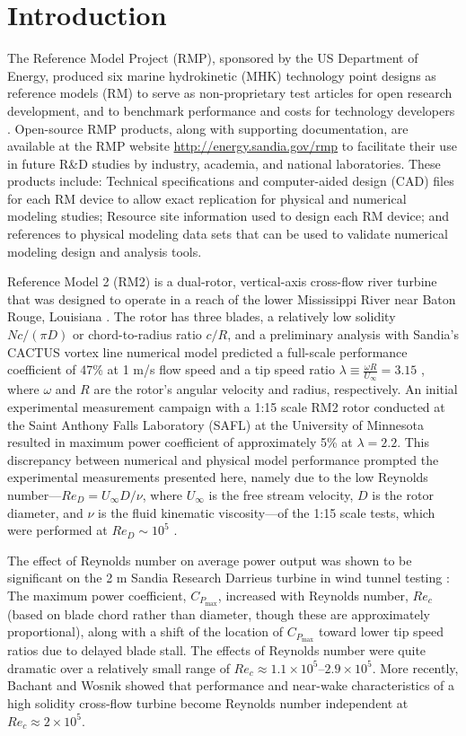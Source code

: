 \documentclass[10pt,letterpaper]{article}
\begin{document}
\section*{Introduction}

The Reference Model Project (RMP), sponsored by the US Department of Energy,
produced six marine hydrokinetic (MHK) technology point designs as reference
models (RM) to serve as non-proprietary test articles for open research
development, and to benchmark performance and costs for technology developers
\cite{Neary2014, Neary2014a}. Open-source RMP products, along with supporting
documentation, are available at the RMP website
\url{http://energy.sandia.gov/rmp} to facilitate their use in future R\&D
studies by industry, academia, and national laboratories. These products
include: Technical specifications and computer-aided design (CAD) files for each
RM device to allow exact replication for physical and numerical modeling
studies; Resource site information used to design each RM device; and references
to physical modeling data sets that can be used to validate numerical modeling
design and analysis tools.

Reference Model 2 (RM2) is a dual-rotor, vertical-axis cross-flow river turbine
that was designed to operate in a reach of the lower Mississippi River near
Baton Rouge, Louisiana \cite{Barone2011, Neary2011}. The rotor has three blades,
a relatively low solidity $Nc/(\pi D)$ or chord-to-radius ratio $c/R$, and a
preliminary analysis with Sandia's CACTUS vortex line numerical model
\cite{Murray2011} predicted a full-scale performance coefficient of 47\% at 1
m/s flow speed and a tip speed ratio $\lambda \equiv \frac{\omega R}{U_\infty} =
3.15$ \cite{Barone2011}, where $\omega$ and $R$ are the rotor's angular velocity
and radius, respectively. An initial experimental measurement campaign with a
1:15 scale RM2 rotor conducted at the Saint Anthony Falls Laboratory (SAFL) at
the University of Minnesota resulted in maximum power coefficient of
approximately 5\% at $\lambda = 2.2$. This discrepancy between numerical and
physical model performance prompted the experimental measurements presented
here, namely due to the low Reynolds number---$Re_D = U_\infty D / \nu$, where
$U_\infty$ is the free stream velocity, $D$ is the rotor diameter, and $\nu$ is
the fluid kinematic viscosity---of the 1:15 scale tests, which were performed at
$Re_D \sim 10^5$ \cite{Hill2014}.

The effect of Reynolds number on average power output was shown to be
significant on the 2 m Sandia Research Darrieus turbine in wind tunnel testing
\cite{Blackwell1976}: The maximum power coefficient, $C_{P_{\max}}$, increased
with Reynolds number, $Re_c$ (based on blade chord rather than diameter, though
these are approximately proportional), along with a shift of the location of
$C_{P_{\max}}$ toward lower tip speed ratios due to delayed blade stall. The
effects of Reynolds number were quite dramatic over a relatively small range of
$Re_c \approx 1.1 \times 10^5$--$2.9 \times 10^5$. More recently, Bachant and
Wosnik \cite{Bachant2014, Bachant2015-RVAT-Re-dep} showed that performance and
near-wake characteristics of a high solidity cross-flow turbine become Reynolds
number independent at $Re_c \approx 2 \times 10^5$.
\end{document}
